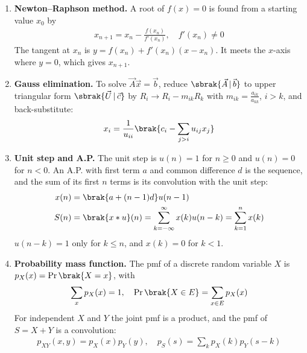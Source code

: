 \begin{enumerate}[label=\thesubsection.\arabic*, ref=\thesubsection.\theenumi, itemsep=0pt]
\begin{align}
\bar{x} &= \frac{\vec{f}^{\top}\vec{x}}{\vec{f}^{\top}\vec{1}}
\label{eq:EE26BTECH11225-mean} \\
\text{Median} &= l + \brak{\frac{\frac{N}{2} - cf}{f}}h
\label{eq:EE26BTECH11225-median}
\end{align}
\item \textbf{Newton--Raphson method.} A root of $f(x) = 0$ is found from a starting value $x_0$ by
\begin{align}
x_{n+1} = x_n - \frac{f(x_n)}{f'(x_n)}, \quad f'(x_n) \neq 0
\label{eq:EE26BTECH11225-newton}
\end{align}
\solution The tangent at $x_n$ is $y = f(x_n) + f'(x_n)(x - x_n)$. It meets the $x$-axis where $y = 0$, which gives $x_{n+1}$.
\item \textbf{Gauss elimination.} To solve $\vec{A}\vec{x} = \vec{b}$, reduce $\sbrak{\vec{A} \,|\, \vec{b}}$ to upper triangular form $\sbrak{\vec{U} \,|\, \vec{c}}$ by $R_i \to R_i - m_{ik}R_k$ with $m_{ik} = \frac{a_{ik}}{a_{kk}}$, $i > k$, and back-substitute:
\begin{align}
x_i = \frac{1}{u_{ii}}\brak{c_i - \sum_{j > i}u_{ij}x_j}
\label{eq:EE26BTECH11225-gauss}
\end{align}
\item \textbf{Unit step and A.P.} The unit step is $u(n) = 1$ for $n \geq 0$ and $u(n) = 0$ for $n < 0$. An A.P. with first term $a$ and common difference $d$ is the sequence, and the sum of its first $n$ terms is its convolution with the unit step:
\begin{align}
x(n) &= \brak{a + (n-1)d}u(n-1)
\label{eq:EE26BTECH11225-ap-step} \\
S(n) &= \brak{x * u}(n) = \sum_{k=-\infty}^{\infty}x(k)u(n-k) = \sum_{k=1}^{n}x(k)
\label{eq:EE26BTECH11225-ap-conv}
\end{align}
\solution $u(n-k) = 1$ only for $k \leq n$, and $x(k) = 0$ for $k < 1$.
\item \textbf{Probability mass function.} The pmf of a discrete random variable $X$ is $p_X(x) = \Pr\brak{X = x}$, with
\begin{align}
\sum_x p_X(x) = 1, \quad \Pr\brak{X \in E} = \sum_{x \in E}p_X(x)
\label{eq:EE26BTECH11225-pmf}
\end{align}
For independent $X$ and $Y$ the joint pmf is a product, and the pmf of $S = X + Y$ is a convolution:
\begin{align}
p_{XY}(x,y) = p_X(x)p_Y(y), \quad p_S(s) = \sum_k p_X(k)p_Y(s-k)
\label{eq:EE26BTECH11225-pmf-sum}
\end{align}
\end{enumerate}
